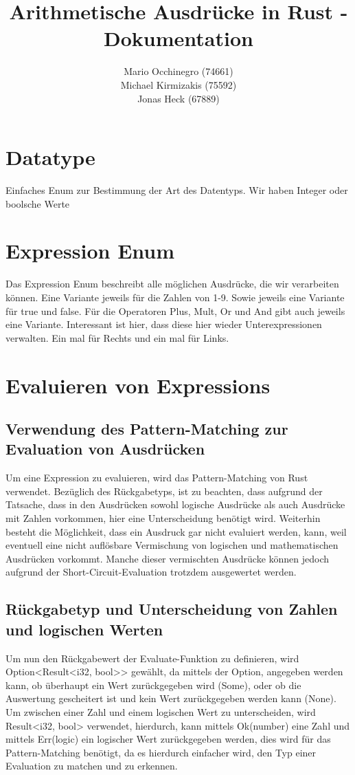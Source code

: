 \documentclass[a4paper, 1ppt]{article}
\title{Arithmetische Ausdrücke in Rust - Dokumentation}
\date{}
\author{
		Mario Occhinegro (74661)\\
		Michael Kirmizakis (75592)\\
		Jonas Heck (67889)
}
\begin{document}
\nocite{*}
\maketitle
\newpage
\clearpage
\tableofcontents
\setcounter{page}{1}
\newpage
{}
\maketitle
\section{Datatype}
Einfaches Enum zur Bestimmung der Art des Datentyps.
Wir haben Integer oder boolsche Werte
\section{Expression Enum}
Das Expression Enum beschreibt alle möglichen Ausdrücke, die wir verarbeiten können.
Eine Variante jeweils für die Zahlen von 1-9. Sowie jeweils eine Variante für true und false.
Für die Operatoren Plus, Mult, Or und And gibt auch jeweils eine Variante. Interessant ist hier, dass 
diese hier wieder Unterexpressionen verwalten. Ein mal für Rechts und ein mal für Links.
\section{Evaluieren von Expressions}
\subsection{Verwendung des Pattern-Matching zur Evaluation von Ausdrücken}
Um eine Expression zu evaluieren, wird das Pattern-Matching von Rust verwendet. Bezüglich des Rückgabetyps, ist zu beachten, dass aufgrund der Tatsache, dass in den Ausdrücken sowohl logische Ausdrücke als auch Ausdrücke mit Zahlen vorkommen, hier eine Unterscheidung benötigt wird. Weiterhin besteht die Möglichkeit, dass ein Ausdruck gar nicht evaluiert werden, kann, weil eventuell eine nicht auflösbare Vermischung von logischen und mathematischen Ausdrücken vorkommt. Manche dieser vermischten Ausdrücke können jedoch aufgrund der Short-Circuit-Evaluation trotzdem ausgewertet werden.
\subsection{Rückgabetyp und Unterscheidung von Zahlen und logischen Werten}
Um nun den Rückgabewert der Evaluate-Funktion zu definieren, wird Option<Result<i32, bool>> gewählt, da mittels der Option, angegeben werden kann, ob überhaupt ein Wert zurückgegeben wird (Some), oder ob die Auswertung gescheitert ist und kein Wert zurückgegeben werden kann (None). Um zwischen einer Zahl und einem logischen Wert zu unterscheiden, wird Result<i32, bool> verwendet, hierdurch, kann mittels Ok(number) eine Zahl und mittels Err(logic) ein logischer Wert zurückgegeben werden, dies wird für das Pattern-Matching benötigt, da es hierdurch einfacher wird, den Typ einer Evaluation zu matchen und zu erkennen.
\end{document}
